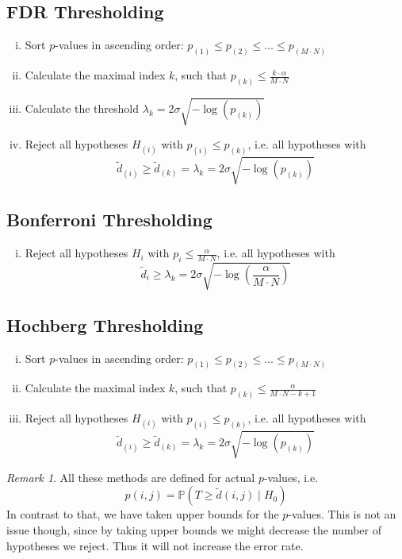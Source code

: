 \documentclass[a4paper,12pt]{article}
\theoremstyle{plain}
\theoremstyle{definition}
\theoremstyle{remark}
\newtheorem{remark}{Remark}
\begin{document}
\subsection{FDR Thresholding}
\begin{enumerate}[(i)]
	\item Sort $p$-values in ascending order: $p_{(1)} \leq p_{(2)} \leq \dots \leq p_{(M \cdot N)}$
	\item Calculate the maximal index $k$, such that $p_{(k)} \leq \frac{k \cdot \alpha}{M \cdot N}$
	\item Calculate the threshold $\lambda_{k} = 2 \sigma \sqrt{- \log(p_{(k)})}$
	\item Reject all hypotheses $H_{(i)}$ with $p_{(i)} \leq p_{(k)}$, i.e. all hypotheses with $$\tilde{d}_{(i)} \geq \tilde{d}_{(k)} = \lambda_{k} = 2 \sigma \sqrt{- \log(p_{(k)})}$$
\end{enumerate}

\subsection{Bonferroni Thresholding}
\begin{enumerate}[(i)]
	\item Reject all hypotheses $H_{i}$ with $p_{i} \leq \frac{\alpha}{M \cdot N}$, i.e. all hypotheses with $$\tilde{d}_{i} \geq \lambda_k = 2 \sigma \sqrt{- \log \left( \frac{\alpha}{M \cdot N} \right)}$$
\end{enumerate}

\subsection{Hochberg Thresholding}
\begin{enumerate}[(i)]
	\item Sort $p$-values in ascending order: $p_{(1)} \leq p_{(2)} \leq \dots \leq p_{(M \cdot N)}$
	\item Calculate the maximal index $k$, such that $p_{(k)} \leq \frac{\alpha}{M \cdot N - k + 1}$
	\item Reject all hypotheses $H_{(i)}$ with $p_{(i)} \leq p_{(k)}$, i.e. all hypotheses with $$\tilde{d}_{(i)} \geq \tilde{d}_{(k)} = \lambda_{k} = 2 \sigma \sqrt{- \log(p_{(k)})}$$
\end{enumerate}

\begin{remark}
	All these methods are defined for actual $p$-values, i.e.
	\begin{equation*}
		p(i, j) = \mathbb{P}(T \geq \tilde{d}(i, j) \mid H_0)
	\end{equation*}
	In contrast to that, we have taken upper bounds for the $p$-values. This is not an issue though, since by taking upper bounds we might decrease the number of hypotheses we reject. Thus it will not increase the error rate.
\end{remark}
\end{document}
